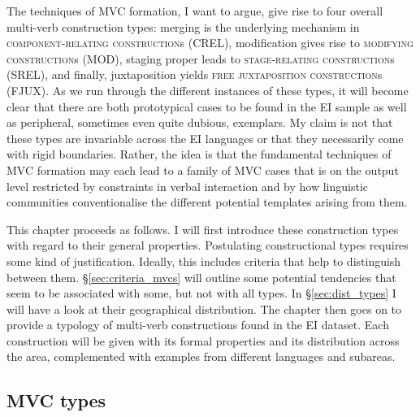 The techniques of MVC formation, I want to argue, give rise to four overall multi-verb construction types: merging is the underlying mechanism in \textsc{component-relating construction}s (CREL), modification gives rise to \textsc{modifying construction}s (MOD), staging proper leads to \textsc{stage-relating construction}s (SREL), and finally, juxtaposition yields \textsc{free juxtaposition construction}s (FJUX). As we run through the different instances of these types, it will become clear that there are both prototypical cases to be found in the EI sample as well as peripheral, sometimes even quite dubious, exemplars. My claim is not that these types are invariable across the EI languages or that they necessarily come with rigid boundaries. Rather, the idea is that the fundamental techniques of MVC formation may each lead to a family of MVC cases that is on the output level restricted by constraints in verbal interaction and by how linguistic communities conventionalise the different potential templates arising from them. 

This chapter proceeds as follows. I will first introduce these construction types with regard to their general properties. Postulating constructional types requires some kind of justification. Ideally, this includes criteria that help to distinguish between them. §\ref{sec:criteria_mvcs} will outline some potential tendencies that seem to be associated with some, but not with all types. In §\ref{sec:dist_types} I will have a look at their geographical distribution. The chapter then goes on to provide a typology of multi-verb constructions found in  the EI dataset. Each construction will be given with its formal properties and its distribution across the area, complemented with examples from different languages and subareas. 

\subsection{MVC types} \label{sec:mvc-types}

